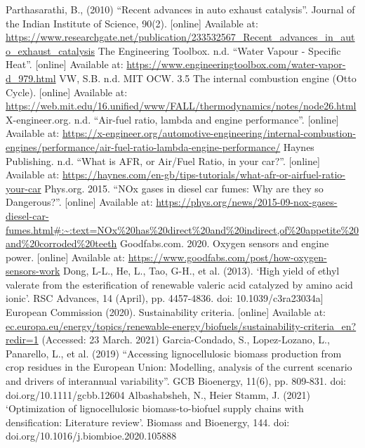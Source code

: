 \begin{thebibliography}{00}
     Parthasarathi, B., (2010) ``Recent advances in auto exhaust catalysis''. Journal of the Indian Institute of Science, 90(2). [online] Available at: \url{https://www.researchgate.net/publication/233532567_Recent_advances_in_auto_exhaust_catalysis}
     The Engineering Toolbox. n.d. ``Water Vapour - Specific Heat''. [online] Available at: \url{https://www.engineeringtoolbox.com/water-vapor-d_979.html}
     VW, S.B. n.d. MIT OCW. 3.5 The internal combustion engine (Otto Cycle). [online] Available at: \url{https://web.mit.edu/16.unified/www/FALL/thermodynamics/notes/node26.html}
    X-engineer.org. n.d. ``Air-fuel ratio, lambda and engine performance''. [online] Available at: \url{https://x-engineer.org/automotive-engineering/internal-combustion-engines/performance/air-fuel-ratio-lambda-engine-performance/}
     Haynes Publishing. n.d. ``What is AFR, or Air/Fuel Ratio, in your car?''. [online] Available at: \url{https://haynes.com/en-gb/tips-tutorials/what-afr-or-airfuel-ratio-your-car}
     Phys.org. 2015. ``NOx gases in diesel car fumes: Why are they so Dangerous?''. [online] Available at: \url{https://phys.org/news/2015-09-nox-gases-diesel-car-fumes.html#:~:text=NOx\%20has\%20direct\%20and\%20indirect,of\%20appetite\%20and\%20corroded\%20teeth}
     Goodfabs.com. 2020. Oxygen sensors and engine power. [online] Available at: \url{https://www.goodfabs.com/post/how-oxygen-sensors-work}
     Dong, L-L., He, L., Tao, G-H., et al. (2013). ‘High yield of ethyl valerate from the esterification of renewable valeric acid catalyzed by amino acid ionic’. RSC Advances, 14 (April), pp. 4457-4836. doi: 10.1039/c3ra23034a]
     European Commission (2020).  Sustainability criteria. [online] Available at: \url{ec.europa.eu/energy/topics/renewable-energy/biofuels/sustainability-criteria_en?redir=1} (Accessed: 23 March. 2021)
     Garcia-Condado, S., Lopez-Lozano, L., Panarello, L., et al. (2019) ``Accessing lignocellulosic biomass production from crop residues in the European Union: Modelling, analysis of the current scenario and drivers of interannual variability''. GCB Bioenergy, 11(6), pp. 809-831. doi: doi.org/10.1111/gcbb.12604
     Albashabsheh, N., Heier Stamm, J. (2021) ‘Optimization of lignocellulosic biomass-to-biofuel supply chains with densification: Literature review’. Biomass and Bioenergy, 144. doi: doi.org/10.1016/j.biombioe.2020.105888
\end{thebibliography}
\newpage
\appendix

